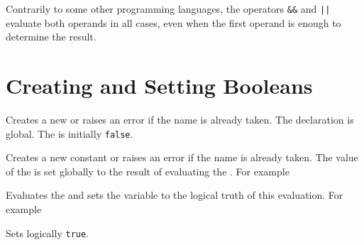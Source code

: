 \documentclass[oneside]{book}
\begin{document}
Contrarily to some other programming languages, the operators \verb|&&| and
\verb"||" evaluate both operands in all cases, even when the first
operand is enough to determine the result.

\section{Creating and Setting Booleans}

\begin{function}{\BoolNew}
\begin{syntax}
 
\end{syntax}
Creates a new  or raises an error if the
name is already taken. The declaration is global. The
 is initially \texttt{false}.
\end{function}

\begin{function}{\BoolConst}
\begin{syntax}
  
\end{syntax}
Creates a new constant  or raises an error if the name
is already taken. The value of the  is set globally to
the result of evaluating the .
For example
\begin{codehigh}
\BoolConst {}
\BoolVarLog \cFooSomeBool
\end{codehigh}
\end{function}

\begin{function}{\BoolSet}
\begin{syntax}
  
\end{syntax}
Evaluates the  and sets the  variable to
the logical truth of this evaluation.
For example
\begin{codehigh}
\BoolSet {}
\BoolVarLog \lTmpaBool
\end{codehigh}
\begin{codehigh}
\BoolSet {}
\BoolVarLog \lTmpaBool
\end{codehigh}
\end{function}

\begin{function}{\BoolSetTrue}
\begin{syntax}
 
\end{syntax}
Sets  logically \texttt{true}.
\end{function}
\end{document}

